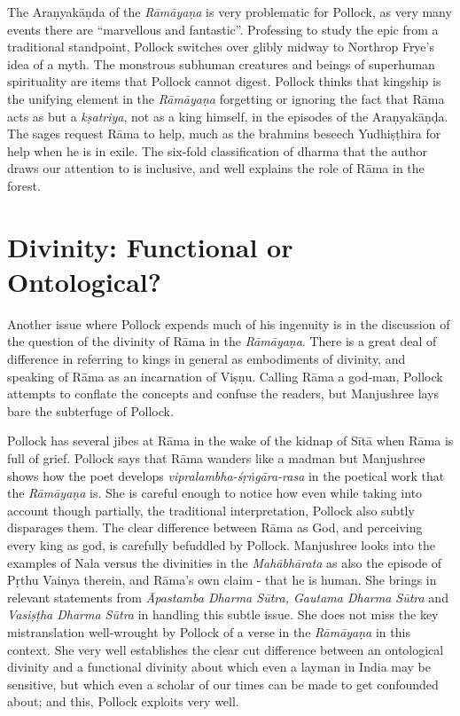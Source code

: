 The Araṇyakāṇda of the {\sl Rāmāyaṇa} is very problematic for Pollock, as very many events there are “marvellous and fantastic”. Professing to study the epic from a traditional standpoint, Pollock switches over glibly midway to Northrop Frye's idea of a myth. The monstrous subhuman creatures and beings of superhuman spirituality are items that Pollock cannot digest. Pollock thinks that kingship is the unifying element in the {\sl Rāmāyaṇa} forgetting or ignoring the fact that Rāma acts as but a {\sl kṣatriya}, not as a king himself, in the episodes of the Araṇyakāṇḍa. The sages request Rāma to help, much as the brahmins beseech Yudhiṣṭhira for help when he is in exile. The six-fold classification of dharma that the author draws our attention to is inclusive, and well explains the role of Rāma in the forest.

\section*{Divinity: Functional or Ontological?}

Another issue where Pollock expends much of his ingenuity is in the discussion of the question of the divinity of Rāma in the {\sl Rāmāyaṇa}. There is a great deal of difference in referring to kings in general as embodiments of divinity, and speaking of Rāma as an incarnation of Viṣṇu. Calling Rāma a god-man, Pollock attempts to conflate the concepts and confuse the readers, but Manjushree lays bare the subterfuge of Pollock.

Pollock has several jibes at Rāma in the wake of the kidnap of Sītā when Rāma is full of grief. Pollock says that Rāma wanders like a madman but Manjushree shows how the poet develops {\sl vipralambha-śṛṅgāra-rasa} in the poetical work that the {\sl Rāmāyaṇa} is. She is careful enough to notice how even while taking into account though partially, the traditional interpretation, Pollock also subtly disparages them. The clear difference between Rāma as God, and perceiving every king as god, is carefully befuddled by Pollock. Manjushree looks into the examples of Nala versus the divinities in the {\sl Mahābhārata} as also the episode of Pṛthu Vainya therein, and Rāma's own claim - that he is human. She brings in relevant statements from {\sl Āpastamba Dharma Sūtra, Gautama Dharma Sūtra} and {\sl Vasiṣṭha Dharma Sūtra} in handling this subtle issue. She does not miss the key mistranslation well-wrought by Pollock of a verse in the {\sl Rāmāyaṇa} in this context. She very well establishes the clear cut difference between an ontological divinity and a functional divinity about which even a layman in India may be sensitive, but which even a scholar of our times can be made to get confounded about; and this, Pollock exploits very well.


